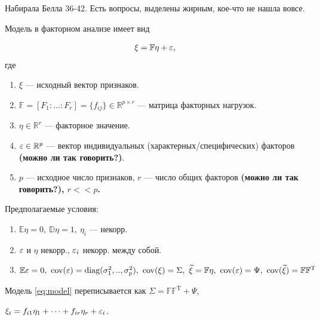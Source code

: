 
{\color{blue} Набирала Белла 36-42. Есть вопросы, выделены жирным, кое-что не нашла вовсе.}
\begin{notation} 
Модель в факторном анализе имеет вид

\begin{gather}\label{eq:model}
\xi = \mathbb{F}\mathbb{\eta} + \mathbb{\varepsilon},
\end{gather}
где

\begin{enumerate}

\item

$\xi$ --- исходный вектор признаков.
\item
$\mathbb{F} = [F_1:\ldots:F_r] = \{f_{ij}\} \in \mathbb{R}^{p\times r}$ --- матрица факторных нагрузок.

\item
$\mathbb{\eta} \in \mathbb{R}^{r}$ --- факторное значение.

\item 
$\mathbb{\varepsilon} \in  \mathbb{R}^{p}$ --- вектор индивидуальных (характерных/специфических) факторов {\bf{(можно ли так говорить?)}}.

\item
$p$ --- исходное число признаков, $r$ --- число общих факторов \bf{(можно ли так говорить?)}, $r << p$.

\end{enumerate}

Предполагаемые условия:

\begin{enumerate}
\item 
$\mathbb{E}\mathbb{\eta} = 0, 
\ \mathbb{D}\mathbb{\eta}= 1, 
\ \eta_{i}$ --- некорр.

\item 
$\mathbb{\varepsilon}$ и $\mathbb{\eta}$ некорр., $\varepsilon_{i}$ некорр. между собой.


\item
$\mathbb{E}\mathbb{\varepsilon} = 0, 
\ {\rm cov}(\varepsilon) = {\rm diag}(\sigma_1^2,..,\sigma_p^2),
\ {\rm cov}(\xi) = \Sigma, 
\ \widetilde\xi = \mathbb{F}\mathbb{\eta}, 
\ {\rm cov}(\mathbb{\varepsilon}) = {\Psi},
\ {\rm cov}(\widetilde\xi) = \mathbb{FF^\mathrm{T}}$
\end{enumerate}

Модель \eqref{eq:model} переписывается как  $\Sigma = \mathbb{FF^\mathrm{T}} + \Psi$,

$\xi_{i} = f_{i1}\eta_1 +\cdots+f_{ir}\eta_r + \varepsilon_i$.
\end{notation}

